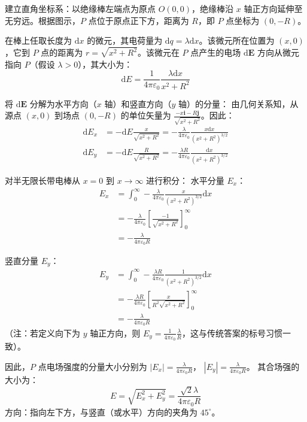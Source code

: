 \begin{solution}
建立直角坐标系：以绝缘棒左端点为原点 $O(0,0)$，绝缘棒沿 $x$ 轴正方向延伸至无穷远。根据图示，$P$ 点位于原点正下方，距离为 $R$，即 $P$ 点坐标为 $(0, -R)$。

在棒上任取长度为 $\mathrm{d}x$ 的微元，其电荷量为 $\mathrm{d}q = \lambda \mathrm{d}x$。该微元所在位置为 $(x, 0)$，它到 $P$ 点的距离为 $r = \sqrt{x^2 + R^2}$。该微元在 $P$ 点产生的电场 $\mathrm{d}\boldsymbol{E}$ 方向从微元指向 $P$（假设 $\lambda > 0$），其大小为：
$$ \mathrm{d}E = \frac{1}{4\pi\varepsilon_0} \frac{\lambda \mathrm{d}x}{x^2 + R^2} $$

将 $\mathrm{d}\boldsymbol{E}$ 分解为水平方向（$x$ 轴）和竖直方向（$y$ 轴）的分量：
由几何关系知，从源点 $(x,0)$ 到场点 $(0,-R)$ 的单位矢量为 $\frac{-x\boldsymbol{i} - R\boldsymbol{j}}{\sqrt{x^2+R^2}}$。因此：
\begin{align*}
    \mathrm{d}E_x &= -\mathrm{d}E \frac{x}{\sqrt{x^2 + R^2}} = -\frac{\lambda}{4\pi\varepsilon_0} \frac{x \mathrm{d}x}{(x^2 + R^2)^{3/2}} \\
    \mathrm{d}E_y &= -\mathrm{d}E \frac{R}{\sqrt{x^2 + R^2}} = -\frac{\lambda R}{4\pi\varepsilon_0} \frac{\mathrm{d}x}{(x^2 + R^2)^{3/2}}
\end{align*}

对半无限长带电棒从 $x=0$ 到 $x \to \infty$ 进行积分：
水平分量 $E_x$：
\[
\begin{aligned}
E_x &= \int_0^\infty -\frac{\lambda}{4\pi\varepsilon_0} \frac{x}{(x^2 + R^2)^{3/2}} \mathrm{d}x\\
  &= -\frac{\lambda}{4\pi\varepsilon_0} \left[ \frac{-1}{\sqrt{x^2 + R^2}} \right]_0^\infty\\
  &= -\frac{\lambda}{4\pi\varepsilon_0 R}
\end{aligned}
\]

竖直分量 $E_y$：
\[
\begin{aligned}
E_y &= \int_0^\infty -\frac{\lambda R}{4\pi\varepsilon_0} \frac{1}{(x^2 + R^2)^{3/2}} \mathrm{d}x\\
  &= -\frac{\lambda R}{4\pi\varepsilon_0} \left[ \frac{x}{R^2\sqrt{x^2 + R^2}} \right]_0^\infty\\
  &= -\frac{\lambda}{4\pi\varepsilon_0 R}
\end{aligned}
\]
（注：若定义向下为 $y$ 轴正方向，则 $E_y = \frac{1}{4\pi\varepsilon_0}\frac{\lambda}{R}$，这与传统答案的标号习惯一致）。

因此，$P$ 点电场强度的分量大小分别为 $|E_x| = \frac{\lambda}{4\pi\varepsilon_0 R}$， $|E_y| = \frac{\lambda}{4\pi\varepsilon_0 R}$。
其合场强的大小为：
$$ E = \sqrt{E_x^2 + E_y^2} = \frac{\sqrt{2}\lambda}{4\pi\varepsilon_0 R} $$
方向：指向左下方，与竖直（或水平）方向的夹角为 $45^\circ$。
\end{solution}

